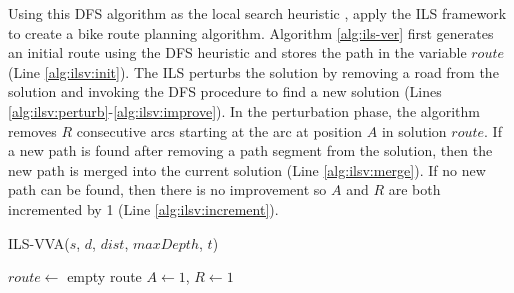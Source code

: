 \documentclass[honors]{union-cs-thesis}
\begin{document}
Using this DFS algorithm as the local search heuristic \citeauthor{verbeeck2014extension}, apply the ILS framework to create a bike route planning algorithm. Algorithm \ref{alg:ils-ver} first generates an initial route using the DFS heuristic and stores the path in the variable $route$ (Line \ref{alg:ilsv:init}). The ILS perturbs the solution by removing a road from the solution and invoking the DFS procedure to find a new solution (Lines \ref{alg:ilsv:perturb}-\ref{alg:ilsv:improve}). In the perturbation phase, the algorithm removes $R$ consecutive arcs starting at the arc at position $A$ in solution $route$. If a new path is found after removing a path segment from the solution, then the new path is merged into the current solution (Line \ref{alg:ilsv:merge}). If no new path can be found, then there is no improvement so $A$ and $R$ are both incremented by 1 (Line \ref{alg:ilsv:increment}).

%
%
\begin{algorithm}
    \caption{ILS-VVA($s$, $d$, $dist$, $maxDepth$, $t$) \label{alg:ils-ver}}
    
    $route \gets$ empty route\;
    $A \gets 1$, $R \gets 1$\;
    
    
\end{algorithm}
\end{document}
